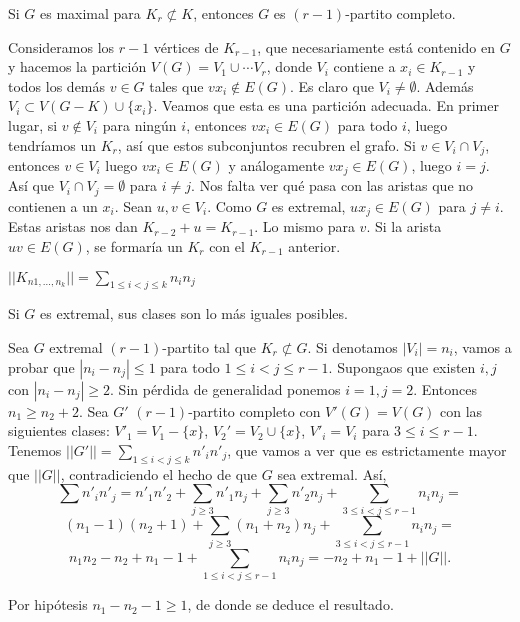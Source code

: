 \documentclass[TGyGC.tex]{subfiles}
\begin{document}
\begin{prop}
Si $G$ es maximal para $K_r\not\subset K$, entonces $G$ es $(r-1)$-partito completo.
\end{prop}
\begin{dem}
Consideramos los $r-1$ vértices de $K_{r-1}$, que necesariamente está contenido en $G$ y hacemos la partición $V(G)=V_1\cup\cdots V_r$, donde $V_i$ contiene a $x_i\in K_{r-1}$ y todos los demás $v\in G$ tales que $vx_i\notin E(G)$. Es claro que $V_i\neq\emptyset$. Además $V_i\subset V(G-K)\cup\{x_i\}$. Veamos que esta es una partición adecuada. En primer lugar, si $v\notin V_i$ para ningún $i$, entonces $vx_i\in E(G)$ para todo $i$, luego tendríamos un $K_r$, así que estos subconjuntos recubren el grafo. Si $v\in V_i\cap V_j$, entonces $v\in V_i$ luego $vx_i\in E(G)$ y análogamente $vx_j\in E(G)$, luego $i=j$. Así que $V_i\cap V_j=\emptyset$ para $i\neq j$. Nos falta ver qué pasa con las aristas que no contienen a un $x_i$. Sean $u,v\in V_i$. Como $G$ es extremal, $ux_j\in E(G)$ para $j\neq i$. Estas aristas nos dan $K_{r-2}+u=K_{r-1}$. Lo mismo para $v$.  Si la arista $uv\in E(G)$, se formaría un $K_r$ con el $K_{r-1}$ anterior. 
\end{dem}


$||K_{n1,\dots, n_k}||=\sum_{1\leq i<j\leq k}n_in_j$


\begin{prop}[diapo 22]
Si $G$ es extremal, sus clases son lo más iguales posibles. 
\end{prop}
\begin{dem}
Sea $G$ extremal $(r-1)$-partito tal que $K_r\not\subset G$. Si denotamos $|V_i|=n_i$, vamos a probar que $|n_i-n_j|\leq 1$ para todo $1\leq i<j\leq r-1$. Supongaos que existen $i,j$ con $|n_i-n_j|\geq 2$. Sin pérdida de generalidad ponemos $i=1, j=2$. Entonces $n_1\geq n_2+2$. Sea $G'$ $(r-1)$-partito completo con $V'(G)=V(G)$ con las siguientes clases: $V'_1=V_1-\{x\}$, $V_2'=V_2\cup\{x\}$, $V'_i=V_i$ para $3\leq i\leq r-1$. 
Tenemos $||G'||=\sum_{1\leq i<j\leq k}n'_in'_j$, que vamos a ver que es estrictamente mayor que $||G||$, contradiciendo el hecho de que $G$ sea extremal. Así,
\[
\sum n'_in'_j=n'_1n'_2+\sum_{j\geq 3}n'_1n_j+\sum_{j\geq 3}n'_2n_j+\sum_{3\leq i<j\leq r-1}n_in_j=
\]
\[
(n_1-1)(n_2+1)+\sum_{j\geq 3}(n_1+n_2)n_j+\sum_{3\leq i<j\leq r-1}n_in_j=
\]
\[
n_1n_2-n_2+n_1-1+\sum_{1\leq i<j\leq r-1} n_in_j=-n_2+n_1-1+||G||.
\]

Por hipótesis $n_1-n_2-1\geq 1$, de donde se deduce el resultado. 
\end{dem}
\end{document}
